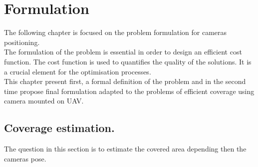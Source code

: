 \chapter{Formulation}

\minitoc
The following chapter is focused on the problem formulation for cameras positioning.\\
The formulation of the problem is essential in order to design an efficient cost function. The cost function is  used to quantifies the quality of the solutions. It is a crucial element for the optimisation processes.\\
This chapter present first, a formal definition of the problem and in the second time propose final formulation adapted to the problems of efficient coverage using camera mounted on UAV.


\section{ Coverage estimation. }


 The question in this section is to estimate the covered area depending then the cameras pose.\\


